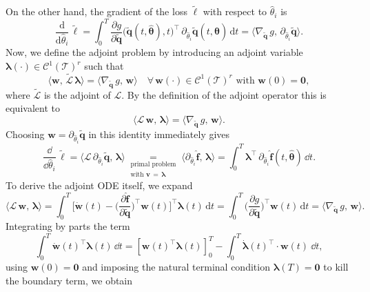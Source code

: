 On the other hand, the gradient of the loss $\tilde{\ell}$ with respect to $\hat{\theta}_i$ is\\
$$\frac{\mathrm{d}}{\mathrm{d}\hat{\theta}_i}\,\tilde\ell
= \int_{0}^{T}
\frac{\partial g}{\partial \tilde{\mathbf{q}}}\bigl(\tilde{\mathbf{q}}(t,\hat{\bm{\theta}}),t\bigr)^{\!\top}
\,\partial_{\hat{\theta}_i}\tilde{\mathbf{q}}(t,\hat{\bm{\theta}})\,\mathrm{d}t
= \langle \nabla_{\tilde{\mathbf{q}}}\,g,\,\partial_{\hat{\theta}_i}\tilde{\mathbf{q}}\rangle.$$
Now, we define the adjoint problem by introducing an adjoint variable $\bm{\lambda}(\cdot)\in\mathcal{C}^1(\mathcal{T})^r$ such that\\
$$\langle \mathbf{w},\,\tilde{\mathcal{L}}\,\bm{\lambda}\rangle
= \langle \nabla_{\tilde{\mathbf{q}}}\,g,\,\mathbf{w}\rangle
\quad\forall\,\mathbf{w}(\cdot)\in\mathcal{C}^1(\mathcal{T})^r\text{ with }\mathbf{w}(0)=\bm{0},$$
where $\tilde{\mathcal{L}}$ is the adjoint of $\mathcal{L}$.  By the definition of the adjoint operator this is equivalent to\\
$$\langle \mathcal{L}\,\mathbf{w},\,\bm{\lambda}\rangle
= \langle \nabla_{\tilde{\mathbf{q}}}\,g,\,\mathbf{w}\rangle.$$
Choosing $\mathbf{w} = \partial_{\hat{\theta}_i}\tilde{\mathbf{q}}$ in this identity immediately gives\\
$$\frac{\dd}{\dd\hat{\theta}_i}\,\tilde\ell
= \bigl\langle \mathcal{L}\,\partial_{\hat{\theta}_i}\tilde{\mathbf{q}},\,\bm{\lambda}\bigr\rangle
\underset{
  \substack{
    \text{primal problem}\\
    \text{with }\mathbf{v}\,=\,\bm{\lambda}
  }
}{=}
\bigl\langle \partial_{\hat{\theta}_i}\hat{\mathbf{f}},\,\bm{\lambda}\bigr\rangle
= \int_{0}^{T}
  \bm{\lambda}^{\!\top}\,
  \partial_{\hat{\theta}_i}\hat{\mathbf{f}}(t,\hat{\bm{\theta}})\,
  \dd t.$$
To derive the adjoint ODE itself, we expand\\
$$\langle \mathcal{L}\,\mathbf{w},\,\bm{\lambda}\rangle
= \int_{0}^{T}
\Biggl[
  \dot{\mathbf{w}}(t)
  - \biggl(\dfrac{\partial\hat{\mathbf{f}}}{\partial\tilde{\mathbf{q}}}\biggr)^{\!\top}
    \mathbf{w}(t)
\Biggr]^{\!\top}
\bm{\lambda}(t)\,\mathrm{d}t
= \int_{0}^{T}
\biggl(\dfrac{\partial g}{\partial\tilde{\mathbf{q}}}\biggr)^{\!\top}
\mathbf{w}(t)\,\mathrm{d}t = \langle \nabla_{\tilde{\mathbf{q}}}\,g,\,\mathbf{w}\rangle.$$
Integrating by parts the term\\
$$\int_{0}^{T}\dot{\mathbf{w}}(t)^{\!\top}\bm{\lambda}(t)\,\dd t =  \left[ \mathbf{w}(t)^{\top}\bm{\lambda}(t)\right]_0^T - \int_0^T \dot{\bm{\lambda}}(t)^{\top}\cdot\mathbf{w}(t)~\dd t,$$
using $\mathbf{w}(0)=\bm{0}$ and imposing the natural terminal condition $\bm{\lambda}(T)=\bm{0}$ to kill the boundary term, we obtain\\
